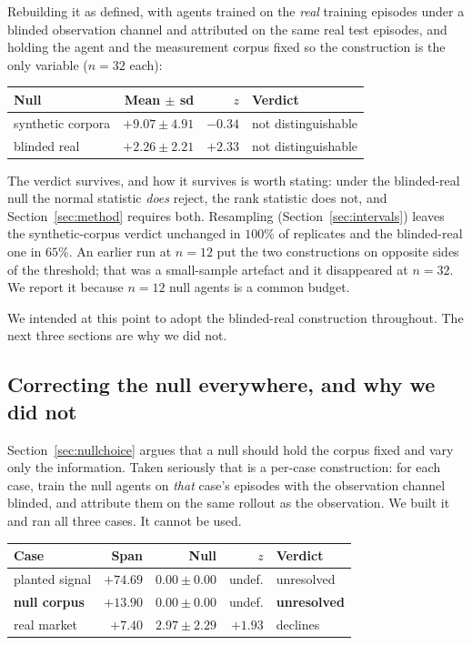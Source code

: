 \documentclass[10pt,twocolumn]{article}
\begin{document}
Rebuilding it as defined, with agents trained on the \emph{real} training
episodes under a blinded observation channel and attributed on the same real
test episodes, and holding the agent and the measurement corpus fixed so the
construction is the only variable ($n=32$ each):

\begin{center}\footnotesize
\begin{tabular}{lrrl}
\toprule
Null & Mean $\pm$ sd & $z$ & Verdict \\
\midrule
synthetic corpora & $+9.07 \pm 4.91$ & $-0.34$ & not distinguishable \\
blinded real & $+2.26 \pm 2.21$ & $+2.33$ & not distinguishable \\
\bottomrule
\end{tabular}
\end{center}

The verdict survives, and how it survives is worth stating: under the
blinded-real null the normal statistic \emph{does} reject, the rank statistic
does not, and Section~\ref{sec:method} requires both. Resampling
(Section~\ref{sec:intervals}) leaves the synthetic-corpus verdict unchanged in
$100\%$ of replicates and the blinded-real one in $65\%$. An earlier run at
$n=12$ put the two constructions on opposite sides of the threshold; that was a
small-sample artefact and it disappeared at $n=32$. We report it because $n=12$
null agents is a common budget.

We intended at this point to adopt the blinded-real construction throughout. The
next three sections are why we did not.

\subsection{Correcting the null everywhere, and why we did not}
\label{sec:matched}

Section~\ref{sec:nullchoice} argues that a null should hold the corpus fixed and
vary only the information. Taken seriously that is a per-case construction: for
each case, train the null agents on \emph{that} case's episodes with the
observation channel blinded, and attribute them on the same rollout as the
observation. We built it and ran all three cases. It cannot be used.

\begin{center}\footnotesize
\begin{tabular}{lrrrl}
\toprule
Case & Span & Null & $z$ & Verdict \\
\midrule
planted signal & $+74.69$ & $0.00 \pm 0.00$ & undef. & unresolved \\
\textbf{null corpus} & $\mathbf{+13.90}$ & $\mathbf{0.00 \pm 0.00}$ & undef. &
\textbf{unresolved} \\
real market & $+7.40$ & $2.97 \pm 2.29$ & $+1.93$ & declines \\
\bottomrule
\end{tabular}
\end{center}
\end{document}
